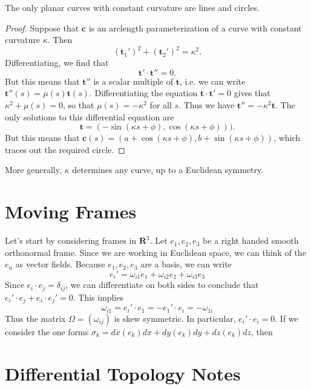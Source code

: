 \begin{theorem}
    The only planar curves with constant curvature are lines and circles.
\end{theorem}
\begin{proof}
    Suppose that $\mathbf{c}$ is an arclength parameterization of a curve with constant curvature $\kappa$. Then
    \[ (\mathbf{t}_1')^2 + (\mathbf{t}_2')^2 = \kappa^2. \]
    Differentiating, we find that
    \[ \mathbf{t}' \cdot \mathbf{t}'' = 0. \]
    But this means that $\mathbf{t}''$ is a scalar multiple of $\mathbf{t}$, i.e. we can write $\mathbf{t}''(s) = \mu(s) \mathbf{t}(s)$. Differentiating the equation $\mathbf{t} \cdot \mathbf{t}' = 0$ gives that $\kappa^2 + \mu(s) = 0$, so that $\mu(s) = -\kappa^2$ for all $s$. Thus we have $\mathbf{t}'' = - \kappa^2 \mathbf{t}$. The only solutions to this differential equation are
    \[ \mathbf{t} = (- \sin( \kappa s + \phi), \cos(\kappa s + \phi))). \]
    But this means that $\mathbf{c}(s) = (a + \cos(\kappa s + \phi), b + \sin(\kappa s + \phi))$, which traces out the required circle.
\end{proof}

More generally, $\kappa$ determines any curve, up to a Euclidean symmetry.



\chapter{Moving Frames}

Let's start by considering frames in $\mathbf{R}^3$. Let $e_1, e_2, e_3$ be a right handed smooth orthonormal frame. Since we are working in Euclidean space, we can think of the $e_n$ as vector fields. Because $e_1, e_2, e_3$ are a basis, we can write
%
\[ e_i' = \omega_{i1} e_1 + \omega_{i2} e_2 + \omega_{i3} e_3 \]
%
Since $e_i \cdot e_j = \delta_{ij}$, we can differentiate on both sides to conclude that $e_i' \cdot e_j + e_i \cdot e_j' = 0$. This implies
%
\[ \omega_{i1} = e_i' \cdot e_1 = - e_1' \cdot e_i = - \omega_{1i} \]
%
Thus the matrix $\Omega = (\omega_{ij})$ is skew symmetric. In particular, $e_i' \cdot e_i = 0$. If we consider the one forms $\sigma_k = dx(e_k) dx + dy(e_k) dy + dz(e_k) dz$, then











\chapter{Differential Topology Notes}

